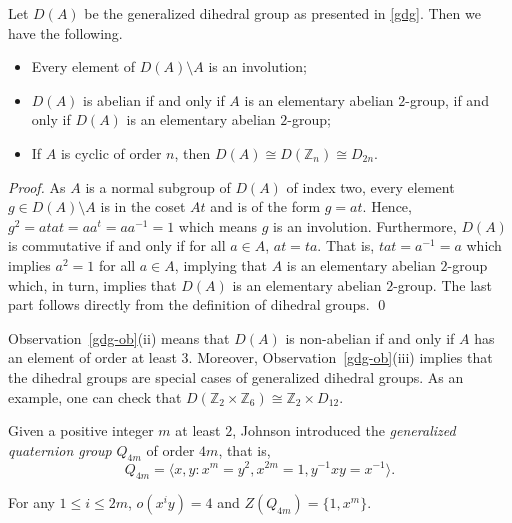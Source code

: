 \documentclass{elsarticle}
\begin{document}
\begin{obs}\label{gdg-ob}
Let $D(A)$ be the generalized dihedral group as presented
in \eqref{gdg}. Then we have the following.
\begin{itemize}
  \item[{\rm (i)}] Every element of $D(A)\setminus A$ is an
    involution;
  \item[{\rm (ii)}] $D(A)$ is abelian if and only if $A$ is an
    elementary abelian $2$-group, if and only if $D(A)$ is an
    elementary abelian $2$-group;
  \item[{\rm (iii)}] If $A$ is cyclic of order $n$, then $D(A)\cong
    D(\mathbb{Z}_n)\cong D_{2n}$.
\end{itemize}
\end{obs}
\begin{proof}
  As $A$ is a normal subgroup of $D(A)$ of index two, every element
  $g\in D(A)\setminus A$ is in the coset $At$ and is of the form
  $g=at$. Hence, $g^2=atat=aa^t=aa^{-1}=1$ which means $g$ is an
  involution. Furthermore, $D(A)$ is commutative if and only if for
  all $a\in A$, $at=ta$. That is, $tat=a^{-1}=a$ which implies $a^2=1$
  for all $a\in A$, implying that $A$ is an elementary abelian
  $2$-group which, in turn, implies that $D(A)$ is an elementary
  abelian $2$-group. The last part follows directly from the definition of
  dihedral groups. \qed
\end{proof}


Observation~\ref{gdg-ob}(ii) means that $D(A)$ is non-abelian if and
only if $A$ has an element of order at least $3$.  Moreover,
Observation~\ref{gdg-ob}(iii) implies that the dihedral groups are
special cases of generalized dihedral groups. As an example, one can
check that $D(\mathbb{Z}_2\times \mathbb{Z}_6)\cong \mathbb{Z}_2\times
D_{12}$.

Given a positive integer $m$ at least $2$, Johnson
\cite[pp. 44--45]{Jon} introduced the {\em generalized quaternion
  group} $Q_{4m}$ of order $4m$, that is,
\begin{equation}\label{q4m}
Q_{4m}=\langle x,y: x^m=y^2, x^{2m}=1, y^{-1}xy=x^{-1}\rangle.
\end{equation}

\begin{obs}\label{obs2}
For any $1\le i \le 2m$, $o(x^iy)=4$ and $Z(Q_{4m})=\{1,x^m\}$.
\end{obs}
\end{document}
